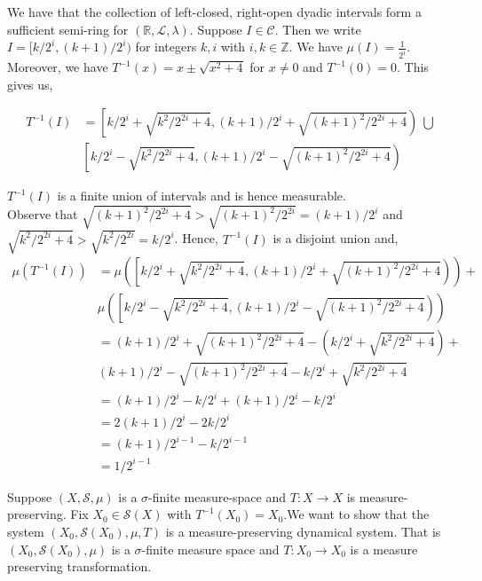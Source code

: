 \documentclass[12pt]{article}
\newenvironment{problem}[2][Problem]{\begin{trivlist}
\item[\hskip \labelsep {\bfseries #1}\hskip \labelsep {\bfseries #2.}]}{\end{trivlist}}
\begin{document}
\begin{problem}{1}
\end{problem}

We have that the collection of left-closed, right-open dyadic intervals form a sufficient semi-ring for $(\mathbb{R}, \mathcal{L}, \lambda)$. Suppose $I \in \mathcal{C}$. Then we write $I = [k/2^i, (k+1)/2^i)$ for integers $k, i$ with $i, k \in \mathbb{Z}$. We have $\mu(I) = \frac{1}{2^i}$. Moreover, we have $T^{-1}(x) = x \pm \sqrt{x^2 + 4}$ for $x \neq 0$ and $T^{-1}(0) = 0$. This gives us,

\begin{align*}
T^{-1}(I) &= \left[k/2^i + \sqrt{k^2/2^{2i} + 4}, (k+1)/2^i + \sqrt{(k+1)^2/2^{2i} + 4} \right) \ \bigcup \\
&\left[k/2^i - \sqrt{k^2/2^{2i} + 4}, (k+1)/2^i - \sqrt{(k+1)^2/2^{2i} + 4} \right)
\end{align*}

$T^{-1}(I)$ is a finite union of intervals and is hence measurable.\\

Observe that $\sqrt{(k+1)^2/2^{2i} + 4} > \sqrt{(k+1)^2/2^{2i}} = (k+1)/2^i$ and  $\sqrt{k^2/2^{2i} + 4} > \sqrt{k^2/2^{2i}} = k/2^i$. Hence, $T^{-1}(I)$ is a disjoint union and,
\begin{align*}
\mu \left( T^{-1}(I) \right) &= \mu\left( \left[k/2^i + \sqrt{k^2/2^{2i} + 4}, (k+1)/2^i + \sqrt{(k+1)^2/2^{2i} + 4} \right) \right) +\\
& \mu \left( \left[k/2^i - \sqrt{k^2/2^{2i} + 4}, (k+1)/2^i - \sqrt{(k+1)^2/2^{2i} + 4} \right) \right)\\
&= (k+1)/2^i + \sqrt{(k+1)^2/2^{2i} + 4}  - (k/2^i + \sqrt{k^2/2^{2i} + 4}) + \\
&(k+1)/2^i - \sqrt{(k+1)^2/2^{2i} + 4} - k/2^i + \sqrt{k^2/2^{2i} + 4}\\
&= (k+1)/2^i - k/2^i + (k+1)/2^i - k/2^i\\
&= 2(k+1)/2^i - 2k/2^i\\
&= (k+1)/2^{i-1} - k/2^{i-1}\\
&= 1/2^{i-1}
\end{align*}

\begin{problem}{2}
\end{problem}

Suppose $(X, \mathcal{S}, \mu)$ is a $\sigma$-finite measure-space and $T: X \to X$ is measure-preserving. Fix $X_0 \in \mathcal{S}(X)$ with $T^{-1}(X_0) = X_0$.We want to show that the system $(X_0, \mathcal{S}(X_0), \mu, T)$ is a measure-preserving dynamical system. That is $(X_0, \mathcal{S}(X_0), \mu)$ is a $\sigma$-finite measure space and $T: X_0 \to X_0$ is a measure preserving transformation.\\
\end{document}
